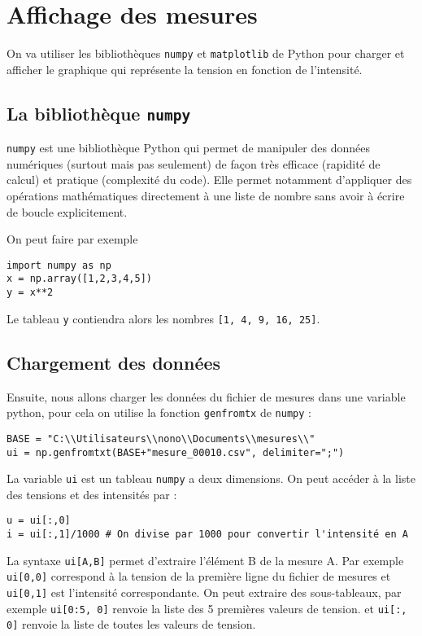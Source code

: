 \documentclass{tp}
\begin{document}
\section{Affichage des mesures}%
\label{sec:affichage_des_mesures}
On va utiliser les bibliothèques \texttt{numpy} et \texttt{matplotlib} de Python pour charger et afficher le graphique qui représente la tension en fonction de l'intensité.

\subsection{La bibliothèque \texttt{numpy} }%
\label{sub:la_bibliotheque_numpy_}
\texttt{numpy} est une bibliothèque Python qui permet de manipuler des données numériques (surtout mais pas seulement) de façon très efficace (rapidité de calcul) et pratique (complexité du code). Elle permet notamment d'appliquer des opérations mathématiques directement à une liste de nombre sans avoir à écrire de boucle explicitement.

On peut faire par exemple
%
\begin{verbatim}
import numpy as np
x = np.array([1,2,3,4,5])
y = x**2
\end{verbatim}
%
Le tableau \texttt{y} contiendra alors les nombres \texttt{[1, 4, 9, 16, 25]}. 

\subsection{Chargement des données}%
\label{sub:chargement_des_donnees}



Ensuite, nous allons charger les données du fichier de mesures dans une variable python, pour cela on utilise la fonction \texttt{genfromtx} de \texttt{numpy} :
%
\begin{verbatim}
BASE = "C:\\Utilisateurs\\nono\\Documents\\mesures\\"
ui = np.genfromtxt(BASE+"mesure_00010.csv", delimiter=";")
\end{verbatim}
%
La variable \texttt{ui} est un tableau \texttt{numpy} a deux dimensions. On peut accéder à la liste des tensions et des intensités par :
\begin{verbatim}
u = ui[:,0]
i = ui[:,1]/1000 # On divise par 1000 pour convertir l'intensité en A
\end{verbatim}
%
La syntaxe \texttt{ui[A,B]} permet d'extraire l'élément B de la mesure A. Par exemple \texttt{ui[0,0]} correspond à la tension de la première ligne du fichier de mesures et \texttt{ui[0,1]} est l'intensité correspondante. On peut extraire des sous-tableaux, par exemple \texttt{ui[0:5, 0]} renvoie la liste des 5 premières valeurs de tension. et \texttt{ui[:, 0]} renvoie la liste de toutes les valeurs de tension.       
\end{document}
